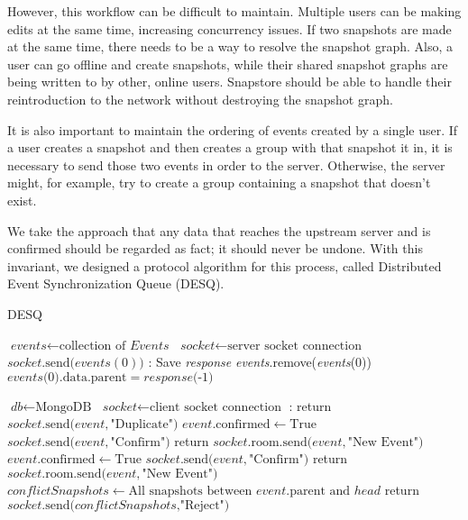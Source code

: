 However, this workflow can be difficult to maintain. Multiple users can be making edits at the same time, increasing concurrency issues. If two snapshots are made at the same time, there needs to be a way to resolve the snapshot graph. Also, a user can go offline and create snapshots, while their shared snapshot graphs are being written to by other, online users. Snapstore should be able to handle their reintroduction to the network without destroying the snapshot graph.

It is also important to maintain the ordering of events created by a single user. If a user creates a snapshot and then creates a group with that snapshot it in, it is necessary to send those two events in order to the server. Otherwise, the server might, for example, try to create a group containing a snapshot that doesn't exist.

We take the approach that any data that reaches the upstream server and is confirmed should be regarded as fact; it should never be undone. With this invariant, we designed a protocol algorithm for this process, called Distributed Event Synchronization Queue (DESQ).

\begin{center}
\begin{algorithm}[h]
\caption{DESQ}\label{euclid}
\begin{algorithmic}[1]
\State $\textit{events} \gets \text{collection of }\textit{Events}$
\State $\textit{socket} \gets \text{server socket connection}$
\State $socket\text{.send(}events(0)\text{)}$
\EndWhile
{}:
\State Save \emph{response}
\State \emph{events}.remove(\emph{events}(0))
\EndIf
{}
\State $events\text{(0).data.parent} = response\text{(-1)}$
\EndIf
\EndLoop
\EndProcedure
\end{algorithmic}
\begin{algorithmic}[1]
\State $\textit{db} \gets \text{MongoDB}$
\State $\textit{socket} \gets \text{client socket connection}$
:
\State return $socket\text{.send(}event, \text{"Duplicate")}$
\EndIf
{}
\State $event\text{.confirmed} \gets \text{True}$
\State $socket\text{.send(}event, \text{"Confirm")}$
\State return $socket\text{.room.send(}event, \text{"New Event")}$
\Else
{}
\State $event\text{.confirmed} \gets \text{True}$
\State $socket\text{.send(}event, \text{"Confirm")}$
\State return $socket\text{.room.send(}event, \text{"New Event")}$
\Else
\State $conflictSnapshots \gets \text{All snapshots between }event\text{.parent and }head$
\State return $socket\text{.send(}conflictSnapshots\text{,"Reject")}$
\EndIf
\EndIf
\EndLoop
\EndProcedure
\end{algorithmic}
\end{algorithm}
\end{center}

